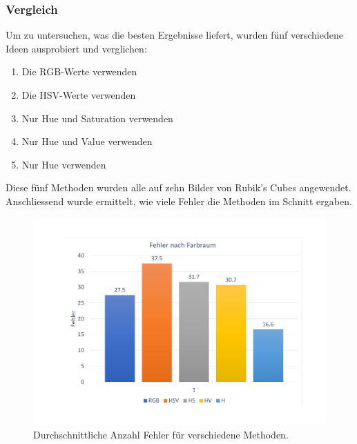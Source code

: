 \documentclass[a4paper, 12pt]{article}
\begin{document}
\subsubsection{Vergleich}
Um zu untersuchen, was die besten Ergebnisse liefert, wurden fünf verschiedene Ideen ausprobiert und verglichen:
\begin{enumerate}
  \item Die RGB-Werte verwenden
  \item Die HSV-Werte verwenden
  \item Nur Hue und Saturation verwenden
  \item Nur Hue und Value verwenden
  \item Nur Hue verwenden
\end{enumerate}
Diese fünf Methoden wurden alle auf zehn Bilder von Rubik's Cubes angewendet. Anschliessend wurde ermittelt, wie viele Fehler die Methoden im Schnitt ergaben. 
\begin{figure}[H]
\includegraphics[scale=0.4]{Fehler_nach_Methode}
\caption{Durchschnittliche Anzahl Fehler für verschiedene Methoden.}
\end{figure}
\noindent
\end{document}
